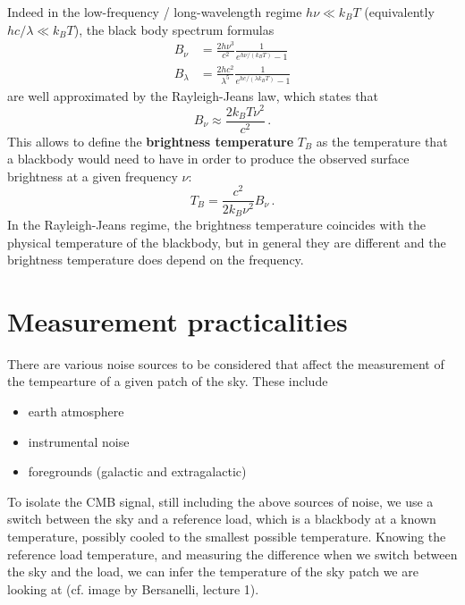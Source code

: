 Indeed in the low-frequency / long-wavelength regime $h\nu \ll k_B T$ (equivalently $hc/\lambda \ll k_B T$), the black body spectrum formulas
\begin{align}
    B_\nu &= \frac{2 h \nu^3}{c^2} \frac{1}{e^{h\nu/(k_B T)} - 1} \\
    B_\lambda &= \frac{2 h c^2}{\lambda^5} \frac{1}{e^{hc/(\lambda k_B T)} - 1}
\end{align}
are well approximated by the Rayleigh-Jeans law, which states that
\begin{equation}
    B_\nu \approx \frac{2 k_B T \nu^2}{c^2} \,.
\end{equation}
This allows to define the \textbf{brightness temperature} $T_B$ as the temperature that a blackbody would need to have in order to produce the observed surface brightness at a given frequency $\nu$:
\begin{equation}
    T_B = \frac{c^2}{2 k_B \nu^2} B_\nu \,.
\end{equation}
In the Rayleigh-Jeans regime, the brightness temperature coincides with the physical temperature of the blackbody, but in general they are different and the brightness temperature does depend on the frequency.


\section{Measurement practicalities}

There are various noise sources to be considered that affect the measurement of the tempearture of a given patch of the sky. 
These include
\begin{itemize}
    \item earth atmosphere
    \item instrumental noise
    \item foregrounds (galactic and extragalactic)
\end{itemize}
To isolate the CMB signal, still including the above sources of noise, we use a switch between the sky and a reference load, which is a blackbody at a known temperature, possibly cooled to the smallest possible temperature.
Knowing the reference load temperature, and measuring the difference when we switch between the sky and the load, we can infer the temperature of the sky patch we are looking at (cf. image by Bersanelli, lecture 1).

